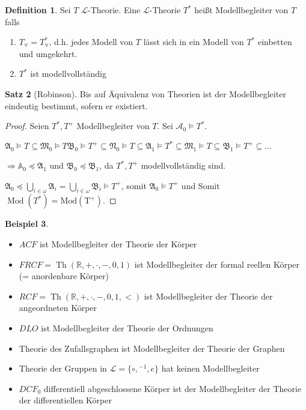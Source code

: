 \documentclass[12pt,parskip=full]{scrartcl}
\newcommand{\setR}{\mathbb{R}}
\theoremstyle{definition}
\newtheorem{theorem}{Satz}[section]
\newtheorem{definition}[theorem]{Definition}
\newtheorem{example}[theorem]{Beispiel}
\begin{document}
	\begin{definition}
		Sei $T$ $\mathcal{L}$-Theorie. Eine $\mathcal{L}$-Theorie $T^*$ heißt Modellbegleiter von $T$ falls
		\begin{enumerate}
			\item $T_\forall = T_\forall^*$, d.h. jedes Modell von $T$ lässt sich in ein Modell von $T^*$ einbetten und umgekehrt.
			\item $T^*$ ist modellvollständig
		\end{enumerate}
	\end{definition}

	\begin{theorem}[Robinson]
		Bis auf Äquivalenz von Theorien ist der Modellbegleiter eindeutig bestimmt, sofern er existiert.
	\end{theorem}

	\begin{proof}
		Seien $T^*, T^+$ Modellbegleiter von $T$. Sei $\mathcal{A}_0 \models T^*$.
		
		$\mathfrak{A}_0 \models T \subseteq \mathfrak{M}_0 \models T \mathfrak{B}_0 \models T^+ \subseteq \mathfrak{N}_0 \models T \subseteq \mathfrak{A}_1 \models T^* \subseteq \mathfrak{M}_1 \models T \subseteq \mathfrak{B}_1 \models T^+ \subseteq \dots$
		
		$\Rightarrow \mathbb{A}_0 \preccurlyeq \mathfrak{A}_1$ und $\mathfrak{B}_0 \preccurlyeq \mathfrak{B}_1$, da $T^*, T^+$ modellvollständig sind.
		
		$\mathfrak{A}_0 \preccurlyeq \bigcup_{i \in \omega} \mathfrak{A}_i = \bigcup_{i \in \omega} \mathfrak{B}_i \models T^+$, somit $\mathfrak{A}_0 \models T^+$ und Somit $\operatorname{Mod}(T^*) = \operatorname{Mod(T^+)}$.
	\end{proof}

	\begin{example}
		\begin{itemize}
			\item $ACF$ ist Modellbegleiter der Theorie der Körper
			\item $FRCF = \operatorname{Th}(\setR, +, \cdot, - , 0, 1)$ ist Modellbegleiter der formal reellen Körper (= anordenbare Körper)
			\item $RCF = \operatorname{Th}(\setR, +, \cdot, -, 0, 1, <)$ ist Modellbegleiter der Theorie der angeordneten Körper
			\item $DLO$ ist Modellbegleiter der Theorie der Ordnungen
			\item Theorie des Zufallsgraphen ist Modellbegleiter der Theorie der Graphen
			\item Theorie der Gruppen in $\mathcal{L} = \{ \circ, {}^{-1}, e \}$ hat keinen Modellbegleiter
			\item $DCF_0$ differentiell abgeschlossene Körper ist der Modellbegleiter der Theorie der differentiellen Körper
		\end{itemize}
	\end{example}
\end{document}
